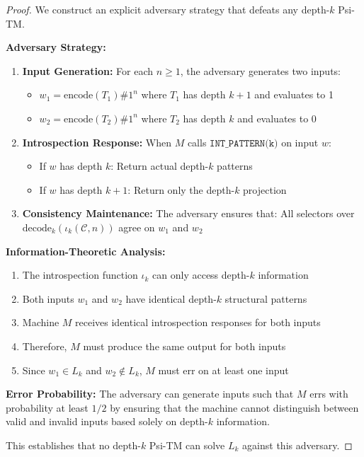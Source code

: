 \begin{proof}
We construct an explicit adversary strategy that defeats any depth-$k$ Psi-TM.

\textbf{Adversary Strategy:}
\begin{enumerate}
\item \textbf{Input Generation:} For each $n \geq 1$, the adversary generates two inputs:
  \begin{itemize}
  \item $w_1 = \text{encode}(T_1)\#1^n$ where $T_1$ has depth $k+1$ and evaluates to 1
  \item $w_2 = \text{encode}(T_2)\#1^n$ where $T_2$ has depth $k$ and evaluates to 0
  \end{itemize}

\item \textbf{Introspection Response:} When $M$ calls $\texttt{INT\_PATTERN(k)}$ on input $w$:
  \begin{itemize}
  \item If $w$ has depth $k$: Return actual depth-$k$ patterns
  \item If $w$ has depth $k+1$: Return only the depth-$k$ projection
  \end{itemize}

\item \textbf{Consistency Maintenance:} The adversary ensures that:
All selectors over $\mathrm{decode}_k(\iota_k(\mathcal{C},n))$ agree on $w_1$ and $w_2$
\end{enumerate}

\textbf{Information-Theoretic Analysis:}
\begin{enumerate}
\item The introspection function $\iota_k$ can only access depth-$k$ information
\item Both inputs $w_1$ and $w_2$ have identical depth-$k$ structural patterns
\item Machine $M$ receives identical introspection responses for both inputs
\item Therefore, $M$ must produce the same output for both inputs
\item Since $w_1 \in L_k$ and $w_2 \notin L_k$, $M$ must err on at least one input
\end{enumerate}

\textbf{Error Probability:}
The adversary can generate inputs such that $M$ errs with probability at least $1/2$ by ensuring that the machine cannot distinguish between valid and invalid inputs based solely on depth-$k$ information.

This establishes that no depth-$k$ Psi-TM can solve $L_k$ against this adversary.
\end{proof}

